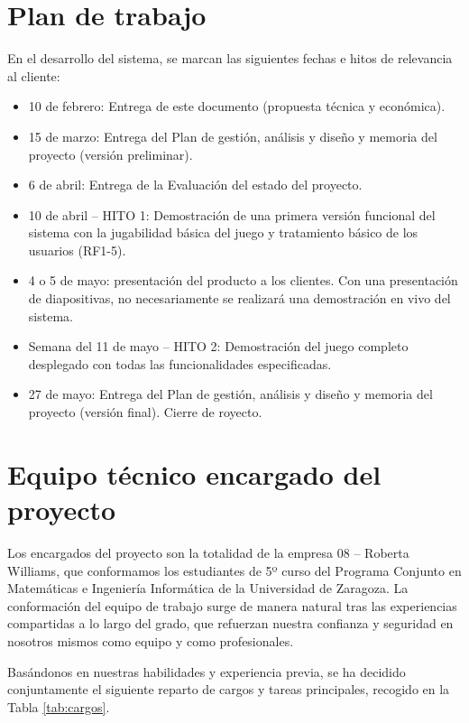 \documentclass[11pt]{article}
\begin{document}
\section{Plan de trabajo}
\label{sec:plan}
En el desarrollo del sistema, se marcan las siguientes fechas e hitos de relevancia al cliente:
\begin{itemize}
		\item 10 de febrero: Entrega de este documento (propuesta técnica y económica).
		\item 15 de marzo: Entrega del Plan de gestión, análisis y diseño y memoria del proyecto (versión preliminar). 
		\item 6 de abril: Entrega de la Evaluación del estado del proyecto.
		\item 10 de abril -- HITO 1: Demostración de una primera versión funcional del sistema con la jugabilidad 
				básica del juego y tratamiento básico de los usuarios (RF1-5).
		\item 4 o 5 de mayo: presentación del producto a los clientes. Con una
				presentación de diapositivas, no necesariamente se realizará
				una demostración en vivo del sistema.
		\item Semana del 11 de mayo -- HITO 2: Demostración del juego completo desplegado con todas las funcionalidades
				especificadas.
		\item 27 de mayo: Entrega del Plan de gestión, análisis y diseño y memoria del proyecto (versión final). Cierre de royecto. 
\end{itemize}

\section{Equipo técnico encargado del proyecto}
\label{sec:equipo}
Los encargados del proyecto son la totalidad de la empresa 08 -- Roberta Williams, que conformamos los estudiantes de
5º curso del Programa Conjunto en Matemáticas e Ingeniería Informática de la Universidad de Zaragoza. 
La conformación del equipo de trabajo surge de manera natural tras las experiencias compartidas a lo
largo del grado, que refuerzan nuestra confianza y seguridad en nosotros mismos como equipo y como
profesionales. 

Basándonos en nuestras habilidades y experiencia previa, se ha decidido conjuntamente el siguiente 
reparto de cargos y tareas principales, 
recogido en la Tabla \ref{tab:cargos}.
\end{document}
